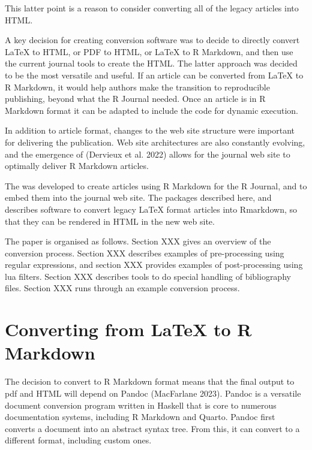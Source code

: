 This latter point is a reason to consider converting all of the legacy articles into HTML.

A key decision for creating conversion software was to decide to directly convert LaTeX to HTML, or PDF to HTML, or LaTeX to R Markdown, and then use the current journal tools to create the HTML. The latter approach was decided to be the most versatile and useful. If an article can be converted from LaTeX to R Markdown, it would help authors make the transition to reproducible publishing, beyond what the R Journal needed. Once an article is in R Markdown format it can be adapted to include the code for dynamic execution.

In addition to article format, changes to the web site structure were important for delivering the publication. Web site architectures are also constantly evolving, and the emergence of  (Dervieux et al. 2022) allows for the journal web site to optimally deliver R Markdown articles.

The  was developed to create articles using R Markdown for the R Journal, and to embed them into the journal web site. The packages described here,  and  describes software to convert legacy LaTeX format articles into Rmarkdown, so that they can be rendered in HTML in the new web site.

The paper is organised as follows. Section XXX gives an overview of the conversion process. Section XXX describes examples of pre-processing using regular expressions, and section XXX provides examples of post-processing using lua filters. Section XXX describes tools to do special handling of bibliography files. Section XXX runs through an example conversion process.

\hypertarget{converting-from-latex-to-r-markdown}{%
\section{Converting from LaTeX to R Markdown}\label{converting-from-latex-to-r-markdown}}

The decision to convert to R Markdown format means that the final output to pdf and HTML will depend on Pandoc (MacFarlane 2023). Pandoc is a versatile document conversion program written in Haskell that is core to numerous documentation systems, including R Markdown and Quarto. Pandoc first converts a document into an abstract syntax tree. From this, it can convert to a different format, including custom ones.

